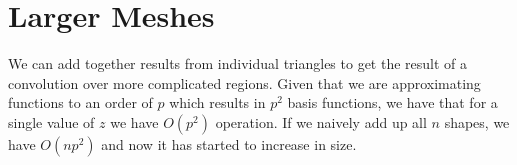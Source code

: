 \documentclass{article}
\begin{document}
\section{Larger Meshes}
We can add together results from individual triangles to get the result of a convolution over more complicated regions.
Given that we are approximating functions to an order of $p$ which results in $p^2$ basis functions, we have that for a single value of $z$ we have $O(p^2)$ operation.
If we naively add up all $n$ shapes, we have $O(np^2)$ and now it has started to increase in size.
\end{document}
